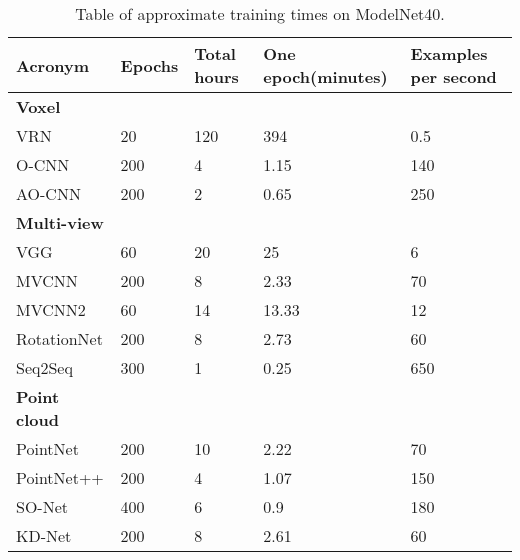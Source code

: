 \begin{table}[]
	\begin{tabular}{lllll}
		\hline
		\textbf{Acronym}       & Epochs & Total hours & One epoch(minutes) & Examples per second \\ \hline
		\textbf{Voxel }        &        &             &                    &                     \\
		VRN                    & 20     & 120         & 394                & 0.5                 \\
		O-CNN                  & 200    & 4           & 1.15               & 140                 \\
		AO-CNN                 & 200    & 2           & 0.65               & 250                 \\
		\textbf{Multi-view }   &        &             &                    &                     \\
		VGG                    & 60     & 20          & 25                 & 6                   \\
		MVCNN                  & 200    & 8           & 2.33               & 70                  \\
		MVCNN2                 & 60     & 14          & 13.33              & 12                  \\
		RotationNet            & 200    & 8           & 2.73               & 60                  \\
		Seq2Seq                & 300    & 1           & 0.25               & 650                 \\
		\textbf{Point cloud  } &        &             &                    &                     \\
		PointNet               & 200    & 10          & 2.22               & 70                  \\
		PointNet++             & 200    & 4           & 1.07               & 150                 \\
		SO-Net                 & 400    & 6           & 0.9                & 180                 \\
		KD-Net                 & 200    & 8           & 2.61               & 60
	\end{tabular}
\caption{Table of approximate training times on ModelNet40.}
\label{Table:accs}
\end{table}